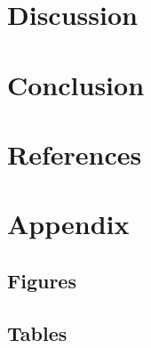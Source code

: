 \documentclass[a4paper]{article}
\begin{document}
\newpage

\hypertarget{discussion}{%
\section{Discussion}\label{discussion}}

\newpage

\hypertarget{conclusion}{%
\section{Conclusion}\label{conclusion}}

\newpage

\hypertarget{references}{%
\section*{References}\label{references}}

\noindent

\setlength{\parindent}{-0.5cm}
\setlength{\leftskip}{0.5cm}
\setlength{\parskip}{8pt}

\hypertarget{refs}{}

\indent
\setlength{\parindent}{17pt}
\setlength{\leftskip}{0pt}
\setlength{\parskip}{0pt}

\newpage

\appendix

\hypertarget{appendix}{%
\section{Appendix}\label{appendix}}

\hypertarget{figures}{%
\subsection{Figures}\label{figures}}

\hypertarget{tables}{%
\subsection{Tables}\label{tables}}

\end{document}
